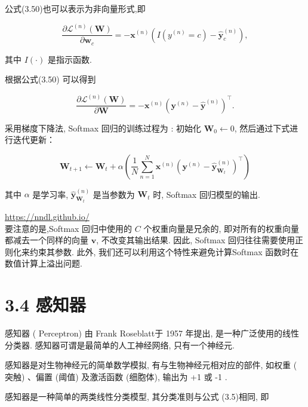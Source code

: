 \documentclass[10pt]{article}
\begin{document}
公式(3.50)也可以表示为非向量形式,即


\begin{equation*}
\frac{\partial \mathcal{L}^{(n)}(\boldsymbol{W})}{\partial \boldsymbol{w}_{c}}=-\boldsymbol{x}^{(n)}\left(I\left(y^{(n)}=c\right)-\hat{\boldsymbol{y}}_{c}^{(n)}\right), \tag{3.51}
\end{equation*}


其中 $I(\cdot)$ 是指示函数.

根据公式(3.50) 可以得到


\begin{equation*}
\frac{\partial \mathcal{L}^{(n)}(\boldsymbol{W})}{\partial \boldsymbol{W}}=-\boldsymbol{x}^{(n)}\left(\boldsymbol{y}^{(n)}-\hat{\boldsymbol{y}}^{(n)}\right)^{\top} . \tag{3.52}
\end{equation*}


采用梯度下降法, Softmax 回归的训练过程为 : 初始化 $\boldsymbol{W}_{0} \leftarrow 0$, 然后通过下式进行迭代更新：


\begin{equation*}
\boldsymbol{W}_{t+1} \leftarrow \boldsymbol{W}_{t}+\alpha\left(\frac{1}{N} \sum_{n=1}^{N} \boldsymbol{x}^{(n)}\left(\boldsymbol{y}^{(n)}-\hat{\boldsymbol{y}}_{\boldsymbol{W}_{t}}^{(n)}\right)^{\top}\right) \tag{3.53}
\end{equation*}


其中 $\alpha$ 是学习率, $\hat{\boldsymbol{y}}_{\boldsymbol{W}_{t}}^{(n)}$ 是当参数为 $\boldsymbol{W}_{t}$ 时, Softmax 回归模型的输出.

\href{https://nndl.github.io/}{https://nndl.github.io/}\\
要注意的是,Softmax 回归中使用的 $C$ 个权重向量是兄余的, 即对所有的权重向量都减去一个同样的向量 $\boldsymbol{v}$, 不改变其输出结果. 因此, Softmax 回归往往需要使用正则化来约束其参数. 此外, 我们还可以利用这个特性来避免计算Softmax 函数时在数值计算上溢出问题.

\section*{3.4 感知器}
感知器 ( Perceptron) 由 Frank Roseblatt于 1957 年提出, 是一种广泛使用的线性分类器. 感知器可谓是最简单的人工神经网络, 只有一个神经元.

感知器是对生物神经元的简单数学模拟, 有与生物神经元相对应的部件, 如权重 ( 突触) 、偏置 (阈值) 及激活函数 (细胞体), 输出为 +1 或 -1 .

感知器是一种简单的两类线性分类模型, 其分类准则与公式 (3.5)相同, 即
\end{document}

